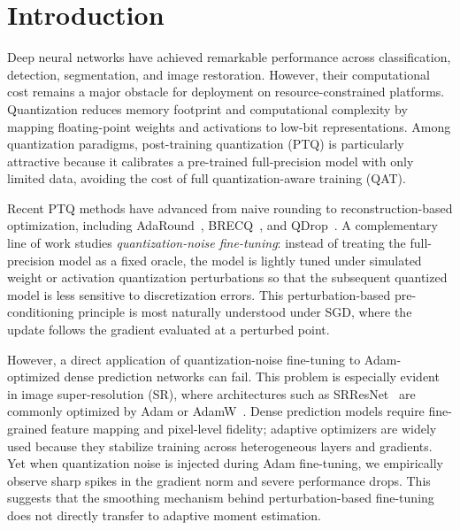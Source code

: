 \documentclass[journal]{IEEEtran}
\begin{document}
\section{Introduction}

Deep neural networks have achieved remarkable performance across classification, detection, segmentation, and image restoration. However, their computational cost remains a major obstacle for deployment on resource-constrained platforms. Quantization reduces memory footprint and computational complexity by mapping floating-point weights and activations to low-bit representations. Among quantization paradigms, post-training quantization (PTQ) is particularly attractive because it calibrates a pre-trained full-precision model with only limited data, avoiding the cost of full quantization-aware training (QAT).

Recent PTQ methods have advanced from naive rounding to reconstruction-based optimization, including AdaRound~\cite{nagel2020adaround}, BRECQ~\cite{li2021brecq}, and QDrop~\cite{wei2022qdrop}. A complementary line of work studies \emph{quantization-noise fine-tuning}: instead of treating the full-precision model as a fixed oracle, the model is lightly tuned under simulated weight or activation quantization perturbations so that the subsequent quantized model is less sensitive to discretization errors. This perturbation-based pre-conditioning principle is most naturally understood under SGD, where the update follows the gradient evaluated at a perturbed point.

However, a direct application of quantization-noise fine-tuning to Adam-optimized dense prediction networks can fail. This problem is especially evident in image super-resolution (SR), where architectures such as SRResNet~\cite{ledig2017srgan} are commonly optimized by Adam or AdamW~\cite{kingma2015adam,loshchilov2019adamw}. Dense prediction models require fine-grained feature mapping and pixel-level fidelity; adaptive optimizers are widely used because they stabilize training across heterogeneous layers and gradients. Yet when quantization noise is injected during Adam fine-tuning, we empirically observe sharp spikes in the gradient norm and severe performance drops. This suggests that the smoothing mechanism behind perturbation-based fine-tuning does not directly transfer to adaptive moment estimation.
\end{document}
